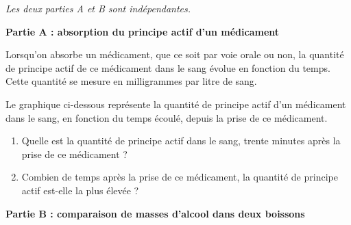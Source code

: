 
\medskip

\emph{Les deux parties A et B sont indépendantes.}

\medskip

\textbf{Partie A : absorption du principe actif d'un médicament}

\smallskip

Lorsqu'on absorbe un médicament, que ce soit par voie orale ou non, la quantité de principe actif de ce médicament dans le sang évolue en fonction du temps. Cette quantité se mesure en milligrammes par litre de sang.

\smallskip

Le graphique ci-dessous représente la quantité de principe actif d'un médicament dans le sang, en fonction du temps écoulé, depuis la prise de ce médicament.

\smallskip


\begin{enumerate}
	\item  Quelle est la quantité de principe actif dans le sang, trente minutes après la prise de ce médicament ?
	
	\item Combien de temps après la prise de ce médicament, la quantité de principe actif est-elle la plus élevée ?
\end{enumerate}

\textbf{Partie B : comparaison de masses d'alcool dans deux boissons}

